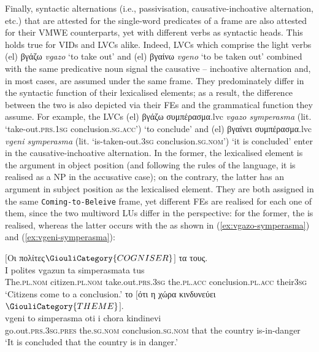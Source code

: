 \documentclass[output=paper,colorlinks,citecolor=brown]{langscibook}
\begin{document}
Finally, syntactic alternations (i.e., passivisation, causative-inchoative alternation, etc.) that are attested for the single-word predicates of a frame are also attested for their VMWE counterparts, yet with different verbs as syntactic heads. This holds true for VIDs and LVCs alike. Indeed, LVCs which comprise the light verbs (el) βγάζω \textit{vgazo} ‘to take out’ and (el) βγαίνω \textit{vgeno} ‘to be taken out’ combined with the same predicative noun signal the causative – inchoative alternation and, in most cases, are assumed under the same frame. They predominately differ in the syntactic function of their lexicalised elements; as a result, the difference between the two is also depicted via their FEs and the grammatical function they assume. For example, the LVCs (el) {{βγάζω}} {{συμπέρασμα}}.lvc \textit{vgazo symperasma} (lit. ‘take-out.\textsc{prs.1sg} conclusion.\textsc{sg.acc}') ‘to conclude' and (el) {{βγαίνει}} {{συμπέρασμα}}.lvc \textit{vgeni symperasma} (lit. ‘is-taken-out.\textsc{3sg}   conclusion.\textsc{sg.nom}') ‘it is concluded' enter in the causative-inchoative alternation. In the former, the lexicalised element is the argument in object position (and following the rules of the language, it is realised as a NP in the accusative case); on the contrary, the latter has an argument in subject position as the lexicalised element. They are both assigned in the same \texttt{Coming-to-Beleive} frame, yet different FEs are realised for each one of them, since the two multiword LUs differ in the perspective: for the former, the  is realised, whereas the latter occurs with the  as shown in (\ref{ex:vgazo-symperasma}) and (\ref{ex:vgeni-symperasma}):\largerpage[2]

\ea
\label{ex:vgazo-symperasma}
\glll
$[$Οι πολίτες$\GiouliCategory{COGNISER}$$]$  τα  τους. \\
I polites vgazun ta	simperasmata tus\\
The.\textsc{pl.nom} citizen.\textsc{pl.nom} take.out.\textsc{prs.3sg} the.\textsc{pl.acc} conclusion.\textsc{pl.acc} their\textsc{3sg}\\
\glt ‘Citizens come to a conclusion.’
\ex
\label{ex:vgeni-symperasma}
\glll
{} το  $[$ότι η χώρα κινδυνεύει$\GiouliCategory{THEME}$$]$. \\
vgeni to simperasma oti i chora kindinevi\\
go.out.\textsc{prs.3sg}.\textsc{pres} the.\textsc{sg.nom} conclusion.\textsc{sg.nom} that the country is-in-danger\\
\glt ‘It is concluded that the country is in danger.’
\z
\end{document}
